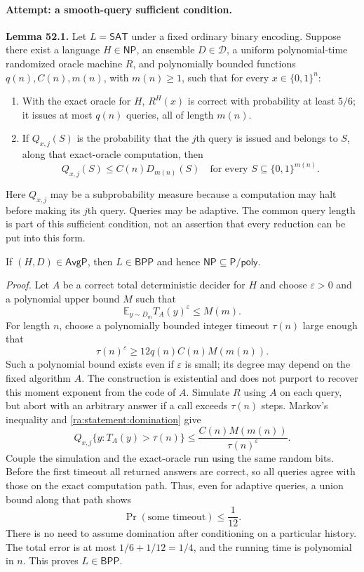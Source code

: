 \documentclass[11pt]{article}
\newcommand{\E}{\mathbb{E}}
\begin{document}
\paragraph{Attempt: a smooth-query sufficient condition.}
\textbf{Lemma 52.1.} Let $L=\mathsf{SAT}$ under a fixed ordinary binary
encoding. Suppose there exist a language $H\in\mathsf{NP}$, an ensemble
$D\in\mathcal D$, a uniform polynomial-time randomized oracle machine $R$,
and polynomially bounded functions $q(n),C(n),m(n)$, with $m(n)\ge1$, such
that for every $x\in\{0,1\}^n$:

\begin{enumerate}[label=(\roman*),leftmargin=2.5em]
\item With the exact oracle for $H$, $R^H(x)$ is correct with probability
at least $5/6$; it issues at most $q(n)$ queries, all of length $m(n)$.
\item If $Q_{x,j}(S)$ is the probability that the $j$th query is issued
and belongs to $S$, along that exact-oracle computation, then
\begin{equation}\label{ra:statement:domination}
 Q_{x,j}(S)\le C(n)D_{m(n)}(S)
 \quad\text{for every }S\subseteq\{0,1\}^{m(n)}.
\end{equation}
\end{enumerate}
Here $Q_{x,j}$ may be a subprobability measure because a computation may
halt before making its $j$th query. Queries may be adaptive. The common
query length is part of this sufficient condition, not an assertion that
every reduction can be put into this form.

If $(H,D)\in\mathsf{AvgP}$, then $L\in\mathsf{BPP}$ and hence
$\mathsf{NP}\subseteq\mathsf{P/poly}$.

\textit{Proof.} Let $A$ be a correct total deterministic decider for $H$
and choose $\varepsilon>0$ and a polynomial upper bound $M$ such that
\[
 \E_{y\sim D_m}T_A(y)^\varepsilon\le M(m).
\]
For length $n$, choose a polynomially bounded integer timeout $\tau(n)$
large enough that
\begin{equation}\label{ra:statement:timeout}
 \tau(n)^\varepsilon\ge
 12q(n)C(n)M(m(n)).
\end{equation}
Such a polynomial bound exists even if $\varepsilon$ is small; its degree
may depend on the fixed algorithm $A$. The construction is existential
and does not purport to recover this moment exponent from the code of $A$.
Simulate $R$ using $A$ on each query, but abort with an arbitrary answer
if a call exceeds $\tau(n)$ steps. Markov's inequality and
\eqref{ra:statement:domination} give
\[
 Q_{x,j}\{y:T_A(y)>\tau(n)\}
 \le\frac{C(n)M(m(n))}{\tau(n)^\varepsilon}.
\]
Couple the simulation and the exact-oracle run using the same random
bits. Before the first timeout all returned answers are correct, so all
queries agree with those on the exact computation path. Thus, even for
adaptive queries, a union bound along that path shows
\[
 \Pr(\text{some timeout})\le\frac1{12}.
\]
There is no need to assume domination after conditioning on a particular
history. The total error is at most $1/6+1/12=1/4$, and the running time
is polynomial in $n$. This proves $L\in\mathsf{BPP}$.
\end{document}
